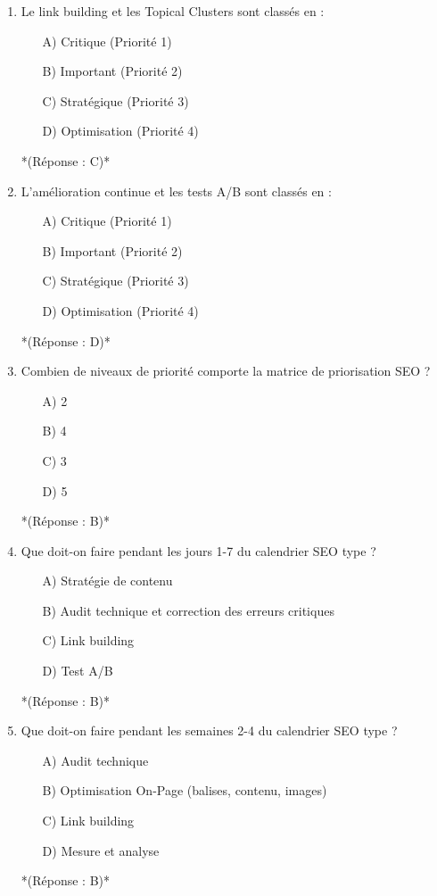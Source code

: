 \documentclass[12pt,a4paper,twoside]{report}
\begin{document}
\begin{enumerate}
    \item Le link building et les Topical Clusters sont classés en :
    \begin{itemize}
        \item[A)] Critique (Priorité 1)
        \item[B)] Important (Priorité 2)
        \item[C)] Stratégique (Priorité 3)
        \item[D)] Optimisation (Priorité 4)
    \end{itemize}
    *(Réponse : C)*

    \item L'amélioration continue et les tests A/B sont classés en :
    \begin{itemize}
        \item[A)] Critique (Priorité 1)
        \item[B)] Important (Priorité 2)
        \item[C)] Stratégique (Priorité 3)
        \item[D)] Optimisation (Priorité 4)
    \end{itemize}
    *(Réponse : D)*

    \item Combien de niveaux de priorité comporte la matrice de priorisation SEO ?
    \begin{itemize}
        \item[A)] 2
        \item[B)] 4
        \item[C)] 3
        \item[D)] 5
    \end{itemize}
    *(Réponse : B)*

    \item Que doit-on faire pendant les jours 1-7 du calendrier SEO type ?
    \begin{itemize}
        \item[A)] Stratégie de contenu
        \item[B)] Audit technique et correction des erreurs critiques
        \item[C)] Link building
        \item[D)] Test A/B
    \end{itemize}
    *(Réponse : B)*

    \item Que doit-on faire pendant les semaines 2-4 du calendrier SEO type ?
    \begin{itemize}
        \item[A)] Audit technique
        \item[B)] Optimisation On-Page (balises, contenu, images)
        \item[C)] Link building
        \item[D)] Mesure et analyse
    \end{itemize}
    *(Réponse : B)*


\end{enumerate}
\end{document}
